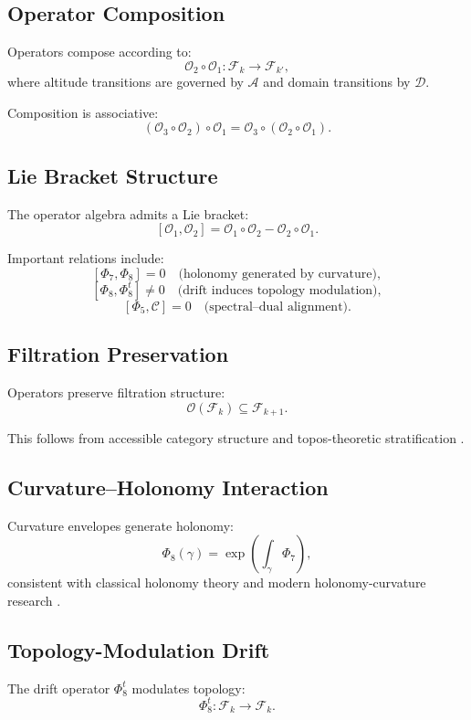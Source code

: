 \subsection{Operator Composition}
Operators compose according to:
\[
\mathcal{O}_2 \circ \mathcal{O}_1 : \mathcal{F}_k \to \mathcal{F}_{k'},
\]
where altitude transitions are governed by $\mathcal{A}$ and domain transitions
by $\mathcal{D}$.

Composition is associative:
\[
(\mathcal{O}_3 \circ \mathcal{O}_2) \circ \mathcal{O}_1
=
\mathcal{O}_3 \circ (\mathcal{O}_2 \circ \mathcal{O}_1).
\]

\subsection{Lie Bracket Structure}
The operator algebra admits a Lie bracket:
\[
[\mathcal{O}_1, \mathcal{O}_2]
=
\mathcal{O}_1 \circ \mathcal{O}_2
-
\mathcal{O}_2 \circ \mathcal{O}_1.
\]

Important relations include:
\[
[\Phi_7, \Phi_8] = 0
\quad\text{(holonomy generated by curvature)},
\]
\[
[\Phi_8, \Phi_8^t] \neq 0
\quad\text{(drift induces topology modulation)},
\]
\[
[\Phi_5, \mathcal{C}] = 0
\quad\text{(spectral–dual alignment)}.
\]

\subsection{Filtration Preservation}
Operators preserve filtration structure:
\[
\mathcal{O}(\mathcal{F}_k) \subseteq \mathcal{F}_{k+1}.
\]

This follows from accessible category structure
and topos-theoretic stratification
.

\subsection{Curvature–Holonomy Interaction}
Curvature envelopes generate holonomy:
\[
\Phi_8(\gamma)
=
\exp\left( \int_\gamma \Phi_7 \right),
\]
consistent with classical holonomy theory
and modern holonomy-curvature research
.

\subsection{Topology-Modulation Drift}
The drift operator $\Phi_8^t$ modulates topology:
\[
\Phi_8^t : \mathcal{F}_k \to \mathcal{F}_k.
\]

